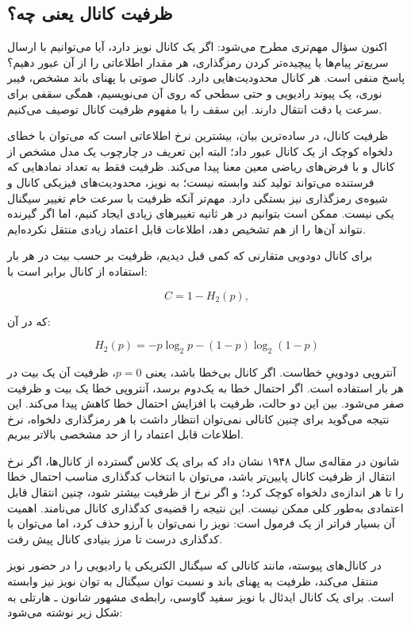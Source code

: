 \subsection{ظرفیت کانال یعنی چه؟}
\label{sub:meaning-of-channel-capacity}

اکنون سؤال مهم‌تری مطرح می‌شود: اگر یک کانال نویز دارد، آیا می‌توانیم با ارسال سریع‌تر پیام‌ها یا پیچیده‌تر کردن رمزگذاری، هر مقدار اطلاعاتی را از آن عبور دهیم؟ پاسخ منفی است. هر کانال محدودیت‌هایی دارد. کانال صوتی با پهنای باند مشخص، فیبر نوری، یک پیوند رادیویی و حتی سطحی که روی آن می‌نویسیم، همگی سقفی برای سرعت یا دقت انتقال دارند. این سقف را با مفهوم ظرفیت کانال توصیف می‌کنیم.

ظرفیت کانال، در ساده‌ترین بیان، بیشترین نرخ اطلاعاتی است که می‌توان با خطای دلخواه کوچک از یک کانال عبور داد؛ البته این تعریف در چارچوب یک مدل مشخص از کانال و با فرض‌های ریاضی معین معنا پیدا می‌کند. ظرفیت فقط به تعداد نمادهایی که فرستنده می‌تواند تولید کند وابسته نیست؛ به نویز، محدودیت‌های فیزیکی کانال و شیوه‌ی رمزگذاری نیز بستگی دارد. مهم‌تر آنکه ظرفیت با سرعت خام تغییر سیگنال یکی نیست. ممکن است بتوانیم در هر ثانیه تغییرهای زیادی ایجاد کنیم، اما اگر گیرنده نتواند آن‌ها را از هم تشخیص دهد، اطلاعات قابل اعتماد زیادی منتقل نکرده‌ایم.

برای کانال دودویی متقارنی که کمی قبل دیدیم، ظرفیت بر حسب بیت در هر بار استفاده از کانال برابر است با:

\[
C = 1-H_2(p),
\]

که در آن:

\[
H_2(p)=-p\log_2 p-(1-p)\log_2(1-p)
\]

آنتروپی دودوییِ خطاست. اگر کانال بی‌خطا باشد، یعنی \(p=0\)، ظرفیت آن یک بیت در هر بار استفاده است. اگر احتمال خطا به یک‌دوم برسد، آنتروپی خطا یک بیت و ظرفیت صفر می‌شود. بین این دو حالت، ظرفیت با افزایش احتمال خطا کاهش پیدا می‌کند. این نتیجه می‌گوید برای چنین کانالی نمی‌توان انتظار داشت با هر رمزگذاری دلخواه، نرخ اطلاعات قابل اعتماد را از حد مشخصی بالاتر ببریم. \autocite{shannon1948,cover2006}

شانون در مقاله‌ی سال ۱۹۴۸ نشان داد که برای یک کلاس گسترده از کانال‌ها، اگر نرخ انتقال از ظرفیت کانال پایین‌تر باشد، می‌توان با انتخاب کدگذاری مناسب احتمال خطا را تا هر اندازه‌ی دلخواه کوچک کرد؛ و اگر نرخ از ظرفیت بیشتر شود، چنین انتقال قابل اعتمادی به‌طور کلی ممکن نیست. این نتیجه را قضیه‌ی کدگذاری کانال می‌نامند. اهمیت آن بسیار فراتر از یک فرمول است: نویز را نمی‌توان با آرزو حذف کرد، اما می‌توان با کدگذاری درست تا مرز بنیادی کانال پیش رفت. \autocite{shannon1948,shannon1949noise}

در کانال‌های پیوسته، مانند کانالی که سیگنال الکتریکی یا رادیویی را در حضور نویز منتقل می‌کند، ظرفیت به پهنای باند و نسبت توان سیگنال به توان نویز نیز وابسته است. برای یک کانال ایدئال با نویز سفید گاوسی، رابطه‌ی مشهور شانون ـ هارتلی به شکل زیر نوشته می‌شود:

